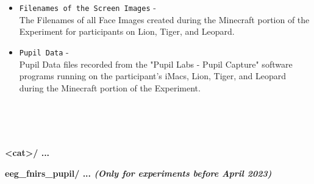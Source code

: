 \begin{description}
\begin{addmargin}[0em]{0em}
\begin{itemize}
        \item \verb|Filenames of the Screen Images| -\\The Filenames of all Face Images created during the Minecraft portion of the Experiment for participants on Lion, Tiger, and Leopard.
        \item \verb|Pupil Data| -\\Pupil Data files recorded from the "Pupil Labs - Pupil Capture" software programs running on the participant's iMacs, Lion, Tiger, and Leopard during the Minecraft portion of the Experiment.
    \end{itemize}

\end{addmargin}



\textbf{\\\\\\}
\item\textbf{<cat>/ ...} %

\begin{addmargin}[0em]{0em} %
    \textbf{eeg\_fnirs\_pupil/ ... \textit{(Only for experiments before April 2023)}}


\end{addmargin}
\end{description}
